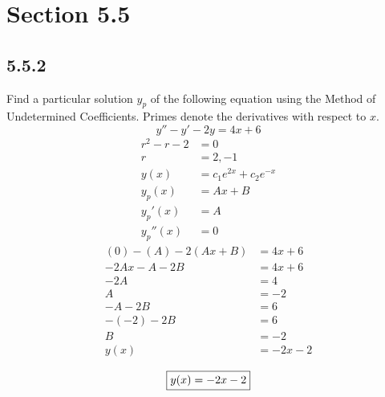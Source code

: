 \documentclass{article}
\begin{document}
\newcommand{\hr}{\par\noindent\rule{\textwidth}{0.4pt}}

\newcommand{\bc}[1]{
	\begin{equation*}
		\begin{boxed}
			{#1}
		\end{boxed}
	\end{equation*}
}

\newcommand{\cond}[2]{
	\ifmmode
		{#1} \quad {#2}
	\else
		$$ {#1} \quad {#2} $$
	\fi
}

\tableofcontents

\section{Section 5.5}

\subsection{5.5.2}
Find a particular solution $ y_p $ of the following equation using the Method of Undetermined Coefficients. Primes denote the derivatives with respect to $ x $.
$$ y'' - y' - 2y = 4x + 6 $$
\begin{align*}
	r^2 - r - 2 & = 0 \\
	r & = 2, -1 \\
	y(x) & = c_1e^{2x} + c_2e^{-x} \\
	y_p(x) & = Ax + B \\
	y_p'(x) & = A \\
	y_p''(x) & = 0
\end{align*}
\begin{align*}
	(0) - (A) - 2(Ax + B) & = 4x + 6 \\
	-2Ax - A - 2B & = 4x + 6 \\
	-2A & = 4 \\
	A & = -2 \\
	-A - 2B & = 6 \\
	-(-2) - 2B & = 6 \\
	B & = -2 \\
	y(x) & = -2x - 2
\end{align*}
\bc{y(x) = -2x - 2}
\end{document}
